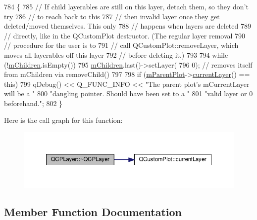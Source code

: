 \begin{DoxyCode}
784                     \{
785   \textcolor{comment}{// If child layerables are still on this layer, detach them, so they don't try}
786   \textcolor{comment}{// to reach back to this}
787   \textcolor{comment}{// then invalid layer once they get deleted/moved themselves. This only}
788   \textcolor{comment}{// happens when layers are deleted}
789   \textcolor{comment}{// directly, like in the QCustomPlot destructor. (The regular layer removal}
790   \textcolor{comment}{// procedure for the user is to}
791   \textcolor{comment}{// call QCustomPlot::removeLayer, which moves all layerables off this layer}
792   \textcolor{comment}{// before deleting it.)}
793 
794   \textcolor{keywordflow}{while} (!\hyperlink{class_q_c_p_layer_a05045efb8a9694e892b71808bd7433f9}{mChildren}.isEmpty())
795     \hyperlink{class_q_c_p_layer_a05045efb8a9694e892b71808bd7433f9}{mChildren}.last()->setLayer(
796         0); \textcolor{comment}{// removes itself from mChildren via removeChild()}
797 
798   \textcolor{keywordflow}{if} (\hyperlink{class_q_c_p_layer_a2f3374a7884bf403720cd1cf6f7ad1bb}{mParentPlot}->\hyperlink{class_q_custom_plot_af73057345656cbd1463454982d808b00}{currentLayer}() == \textcolor{keyword}{this})
799     qDebug() << Q\_FUNC\_INFO << \textcolor{stringliteral}{"The parent plot's mCurrentLayer will be a "}
800                                \textcolor{stringliteral}{"dangling pointer. Should have been set to a "}
801                                \textcolor{stringliteral}{"valid layer or 0 beforehand."};
802 \}
\end{DoxyCode}


Here is the call graph for this function\+:\nopagebreak
\begin{figure}[H]
\begin{center}
\leavevmode
\includegraphics[width=350pt]{class_q_c_p_layer_afc1a8940f8e34c9f25ead9dfd4828cae_cgraph}
\end{center}
\end{figure}




\subsection{Member Function Documentation}
\hypertarget{class_q_c_p_layer_a57ce5e49364aa9122276d5df3b4a0ddc}{}
